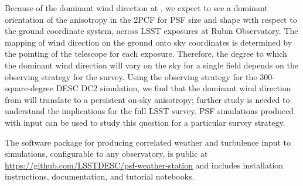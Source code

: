 \documentclass[twocolumn]{aastex631}
\begin{document}
Because of the dominant wind direction at \cp, we expect to see a dominant orientation of the anisotropy in the 2PCF for PSF size and shape with respect to the ground coordinate system, across LSST exposures at Rubin Observatory.  
The mapping of wind direction on the ground onto sky coordinates is determined by the pointing of the telescope for each exposure. 
Therefore, the degree to which the dominant wind direction will vary on the sky for a single field
depends on the observing strategy for the survey. 
Using the observing strategy for the 300-square-degree DESC DC2 simulation, we find that the dominant wind direction from  will translate to a persistent on-sky anisotropy; further study is needed to understand the implications for the full LSST survey. 
PSF simulations produced with \psfws input can be used to study this question for a particular survey strategy. 

The \psfws software package for producing correlated weather and turbulence input to simulations, configurable to any observatory, is public at \url{https://github.com/LSSTDESC/psf-weather-station} and includes installation instructions, documentation, and tutorial notebooks.

\end{document}
